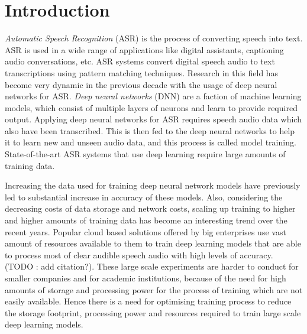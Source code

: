 \chapter{Introduction}
\label{chapter:intro}
\emph{Automatic Speech Recognition} (ASR) is the process of converting speech into text. ASR is used in a wide range of applications like digital assistants,  captioning audio conversations, etc. ASR systems convert digital speech audio to text transcriptions using pattern matching techniques. Research in this field has become very dynamic in the previous decade with the usage of deep neural networks for ASR. \emph{Deep neural networks} (DNN) are a faction of machine learning models, which consist of multiple layers of neurons and learn to provide required output. Applying deep neural networks for ASR requires speech audio data which also have been transcribed. This is then fed to the deep neural networks to help it to learn new and unseen audio data, and this process is called model training. State-of-the-art ASR systems that use deep learning require large amounts of training data. 

Increasing the data used for training deep neural network models have previously led to substantial increase in accuracy of these models. Also, considering the decreasing costs of data storage and network costs, scaling up training to higher and higher amounts of training data has become an interesting trend over the recent years. Popular cloud based solutions offered by big enterprises use vast amount of resources available to them to train deep learning models that are able to process most of clear audible speech audio with high levels of accuracy. (TODO : add citation?). These large scale experiments are harder to conduct for smaller companies and for academic institutions, because of the need for high amounts of storage and processing power for the process of training which are not easily available. Hence there is a need for optimising training process to reduce the storage footprint, processing power and resources required to train large scale deep learning models.


